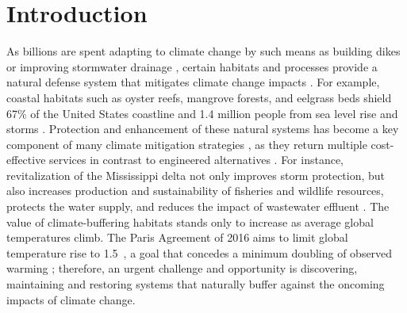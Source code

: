 \documentclass[draft,linenumbers]{AGUJournal}
\begin{document}
\section{Introduction}

As billions are spent adapting to climate change by such means as building dikes or improving stormwater drainage \citep{Narain:2011}, certain habitats and processes provide a natural defense system that mitigates climate change impacts \citep{Jones:2012}. For example, coastal habitats such as oyster reefs, mangrove forests, and eelgrass beds shield 67\% of the United States coastline and 1.4 million people from sea level rise and storms \citep{Arkema:2013}. Protection and enhancement of these natural systems has become a key component of many climate mitigation strategies \citep{Guerry:2015}, as they return multiple cost-effective services in contrast to engineered alternatives \citep{Jones:2012}. For instance, revitalization of the Mississippi delta not only improves storm protection, but also increases production and sustainability of fisheries and wildlife resources, protects the water supply, and reduces the impact of wastewater effluent \citep{LDNR:1998}. The value of climate-buffering habitats stands only to increase as average global temperatures climb. The Paris Agreement of 2016 aims to limit global temperature rise to 1.5\celsius~\citep{Hulme:2016}, a goal that concedes a minimum doubling of observed warming \citep{Hartmann:2013}; therefore, an urgent challenge and opportunity is discovering, maintaining and restoring systems that naturally buffer against the oncoming impacts of climate change.
\end{document}
